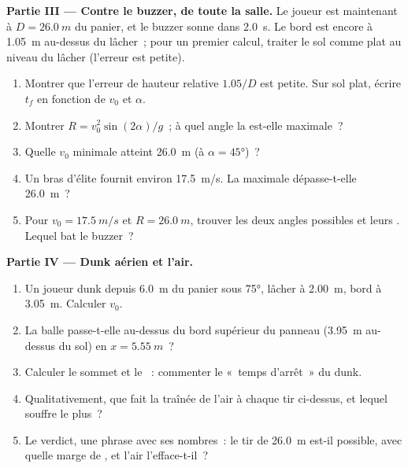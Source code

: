 \begin{problem}
\medskip
\noindent\textbf{Partie III --- Contre le buzzer, de toute la salle.}
Le joueur est maintenant à $D = \qty{26.0}{m}$ du panier, et le buzzer
sonne dans \qty{2.0}{s}. Le bord est encore à \qty{1.05}{m} au-dessus
du lâcher~; pour un premier calcul, traiter le sol comme plat au niveau
du lâcher (l'erreur est petite).
\begin{enumerate}[resume]
  \item Montrer que l'erreur de hauteur relative $1.05/D$ est petite.
        Sur sol plat, écrire $t_f$ en fonction de $v_0$ et $\alpha$.
  \item Montrer $R = v_0^2\sin(2\alpha)/g$~; à quel angle la
         est-elle maximale~?
  \item Quelle $v_0$ minimale atteint \qty{26.0}{m} (à
        $\alpha = \ang{45}$)~?
  \item Un bras d'élite fournit environ \qty{17.5}{m/s}. La
         maximale dépasse-t-elle \qty{26.0}{m}~?
  \item Pour $v_0 = \qty{17.5}{m/s}$ et $R = \qty{26.0}{m}$, trouver les
        deux angles possibles et leurs . Lequel bat le
        buzzer~?
\end{enumerate}

\medskip
\noindent\textbf{Partie IV --- Dunk aérien et l'air.}
\begin{enumerate}[resume]
  \item Un joueur dunk depuis \qty{6.0}{m} du panier sous \ang{75},
        lâcher à \qty{2.00}{m}, bord à \qty{3.05}{m}. Calculer $v_0$.
  \item La balle passe-t-elle au-dessus du bord supérieur du panneau
        (\qty{3.95}{m} au-dessus du sol) en $x = \qty{5.55}{m}$~?
  \item Calculer le sommet et le ~: commenter le «~temps
        d'arrêt~» du dunk.
  \item Qualitativement, que fait la traînée de l'air à chaque tir
        ci-dessus, et lequel souffre le plus~?
  \item Le verdict, une phrase avec ses nombres~: le tir de
        \qty{26.0}{m} est-il possible, avec quelle marge de
        , et l'air l'efface-t-il~?
\end{enumerate}
\end{problem}
